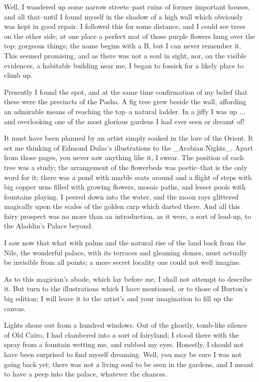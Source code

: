 Well, I wandered up some narrow streets--past ruins of former
important houses, and all that--until I found myself in the shadow of
a high wall which obviously was kept in good repair. I followed this
for some distance, and I could see trees on the other side; at one
place a perfect mat of those purple flowers hung over the top;
gorgeous things; the name begins with a B, but I can never remember
it. This seemed promising, and as there was not a soul in sight, nor,
on the visible evidences, a habitable building near me, I began to
fossick for a likely place to climb up.

Presently I found the spot, and at the same time confirmation of my
belief that these were the precincts of the Pasha. A fig tree grew
beside the wall, affording an admirable means of reaching the top--a
natural ladder. In a jiffy I was up ... and overlooking one of the
most glorious gardens I had ever seen or dreamt of!

It must have been planned by an artist simply soaked in the lore of
the Orient. It set me thinking of Edmond Dulac's illustrations to the
_Arabian Nights_. Apart from those pages, you never saw anything like
it, I swear. The position of each tree was a study; the arrangement of
the flowerbeds was poetic--that is the only word for it; there was a
pond with marble seats around and a flight of steps with big copper
urns filled with growing flowers, mosaic paths, and lesser pools with
fountains playing. I peered down into the water, and the moon rays
glittered magically upon the scales of the golden carp which darted
there. And all this fairy prospect was no more than an introduction,
as it were, a sort of lead-up, to the Aladdin's Palace beyond.

I saw now that what with palms and the natural rise of the land back
from the Nile, the wonderful palace, with its terraces and gleaming
domes, must actually be invisible from all points; a more secret
locality one could not well imagine.

As to this magician's abode, which lay before me, I shall not attempt
to describe it. But turn to the illustrations which I have mentioned,
or to those of Burton's big edition; I will leave it to the artist's
and your imagination to fill up the canvas.

Lights shone out from a hundred windows. Out of the ghostly, tomb-like
silence of Old Cairo, I had clambered into a sort of fairyland; I
stood there with the spray from a fountain wetting me, and rubbed my
eyes. Honestly, I should not have been surprised to find myself
dreaming. Well, you may be sure I was not going back yet; there was
not a living soul to be seen in the gardens, and I meant to have a
peep into the palace, whatever the chances.

